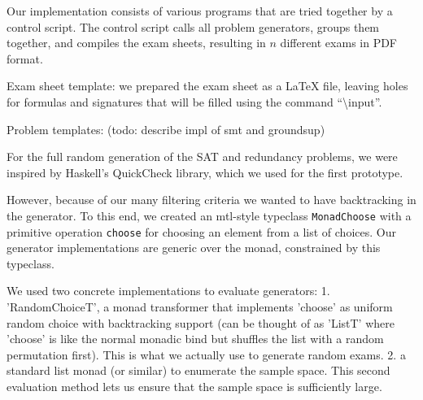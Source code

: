 Our implementation consists of various programs that are tried together by a control script.
The control script calls all problem generators, groups them together,
and compiles the exam sheets, resulting in $n$ different exams in PDF format.

Exam sheet template:
we prepared the exam sheet as a \LaTeX{} file,
leaving holes for formulas and signatures that
will be filled using the command ``\textbackslash{}input''.



Problem templates: (todo: describe impl of smt and groundsup)



For the full random generation of the SAT and redundancy problems,
we were inspired by Haskell's QuickCheck library,
which we used for the first prototype.

However, because of our many filtering criteria we wanted to have backtracking in the generator.
To this end, we created an mtl-style typeclass \texttt{MonadChoose} with a primitive operation \texttt{choose} for choosing an element from a list of choices.
Our generator implementations are generic over the monad, constrained by this typeclass.

We used two concrete implementations to evaluate generators:
1. 'RandomChoiceT', a monad transformer that implements 'choose' as uniform random choice with backtracking support
    (can be thought of as 'ListT' where 'choose' is like the normal monadic bind but shuffles the list with a random permutation first).
    This is what we actually use to generate random exams.
2. a standard list monad (or similar) to enumerate the sample space.
    This second evaluation method lets us ensure that the sample space is sufficiently large.

